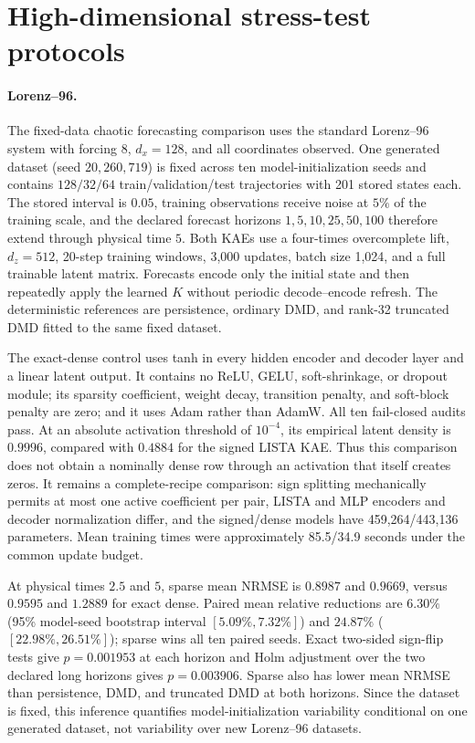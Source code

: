 \section{High-dimensional stress-test protocols}
\label{app:highdimensional_confirmation}

\paragraph{Lorenz--96.}
The fixed-data chaotic forecasting comparison uses the standard Lorenz--96 system with
forcing $8$, $d_x=128$, and all coordinates observed. One generated
dataset (seed $20{,}260{,}719$) is fixed across ten model-initialization
seeds and contains $128/32/64$ train/validation/test trajectories with 201
stored states each. The stored interval is $0.05$, training observations
receive noise at $5\%$ of the training scale, and the declared forecast
horizons $1,5,10,25,50,100$ therefore extend through physical time $5$.
Both KAEs use a four-times overcomplete lift, $d_z=512$, 20-step training
windows, 3,000 updates, batch size 1,024, and a full trainable latent matrix.
Forecasts encode only the initial state and then repeatedly apply the learned
$K$ without periodic decode--encode refresh.
The deterministic references are persistence, ordinary DMD, and rank-32
truncated DMD fitted to the same fixed dataset.

The exact-dense control uses tanh in every hidden encoder and decoder layer and
a linear latent output. It contains no ReLU, GELU, soft-shrinkage, or dropout
module; its sparsity coefficient, weight decay, transition penalty, and
soft-block penalty are zero; and it uses Adam rather than AdamW. All ten
fail-closed audits pass. At an absolute activation threshold of $10^{-4}$,
its empirical latent density is $0.9996$, compared with $0.4884$ for the
signed LISTA KAE. Thus this comparison does not obtain a nominally dense row
through an activation that itself creates zeros. It remains a complete-recipe
comparison: sign splitting mechanically permits at most one active coefficient
per pair, LISTA and MLP encoders and decoder normalization differ, and the
signed/dense models have 459,264/443,136 parameters. Mean training times were
approximately 85.5/34.9 seconds under the common update budget.

At physical times $2.5$ and $5$, sparse mean NRMSE is $0.8987$ and
$0.9669$, versus $0.9595$ and $1.2889$ for exact dense. Paired mean
relative reductions are $6.30\%$ (95\% model-seed bootstrap interval
$[5.09\%,7.32\%]$) and $24.87\%$
($[22.98\%,26.51\%]$); sparse wins all ten paired seeds. Exact two-sided
sign-flip tests give $p=0.001953$ at each horizon and Holm adjustment over
the two declared long horizons gives $p=0.003906$. Sparse also has lower
mean NRMSE than persistence, DMD, and truncated DMD at both horizons. Since
the dataset is fixed, this inference quantifies model-initialization
variability conditional on one generated dataset, not variability over new
Lorenz--96 datasets.

